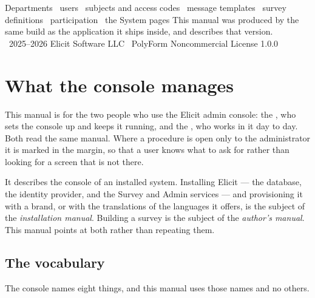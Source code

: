 \documentclass[11pt, a4paper]{article}
\begin{document}
%
  {Departments \textperiodcentered\ users \textperiodcentered\ subjects and access codes \textperiodcentered\ message templates \textperiodcentered\ survey definitions \textperiodcentered\ participation \textperiodcentered\ the System pages}%
  {This manual was produced by the same build as the application it ships inside, and describes that version.\\[0.5em] \textcopyright\ 2025--2026 Elicit Software LLC \textperiodcentered\ PolyForm Noncommercial License 1.0.0}

\setcounter{page}{1}
\elicitContents

\clearpage
{}
\setcounter{page}{1}


\section{What the console manages}
\label{sec:overview}

This manual is for the two people who use the Elicit admin console: the ,
who sets the console up and keeps it running, and the , who works in it day to day.
Both read the same manual. Where a procedure is open only to the administrator it is marked in
the margin, so that a user knows what to ask for rather than looking for a screen that is not
there.

It describes the console of an installed system. Installing Elicit — the database, the identity
provider, and the Survey and Admin services — and provisioning it with a brand, or with the
translations of the languages it offers, is the subject of the \emph{installation manual}. Building a
survey is the subject of the \emph{author's manual}. This manual points at both rather than
repeating them.

\subsection{The vocabulary}

The console names eight things, and this manual uses those names and no others.
\end{document}
